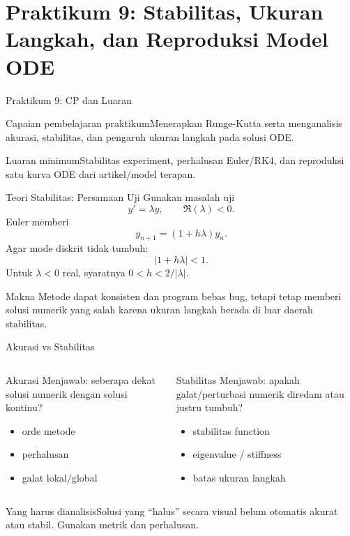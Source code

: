 \documentclass[slides,english,noindex,lean,nobackpage,nocopyright,noupdate,nosummary]{enacom}
\newcommand{\CPBox}[1]{\begin{block}{Capaian pembelajaran praktikum}#1\end{block}}
\newcommand{\OutBox}[1]{\begin{exampleblock}{Luaran minimum}#1\end{exampleblock}}
\newcommand{\AnalysisBox}[1]{\begin{alertblock}{Yang harus dianalisis}#1\end{alertblock}}
\begin{document}
\section{Praktikum 9: Stabilitas, Ukuran Langkah, dan Reproduksi Model ODE}

\begin{frame}{Praktikum 9: CP dan Luaran}
\CPBox{Menerapkan Runge-Kutta serta menganalisis akurasi, stabilitas, dan pengaruh ukuran langkah pada solusi ODE.}
\OutBox{Stabilitas experiment, perhalusan Euler/RK4, dan reproduksi satu kurva ODE dari artikel/model terapan.}
\end{frame}

\begin{frame}{Teori Stabilitas: Persamaan Uji}
Gunakan masalah uji
\[
y'=\lambda y,\qquad \Re(\lambda)<0.
\]
Euler memberi
\[
y_{n+1}=(1+h\lambda)y_n.
\]
Agar mode diskrit tidak tumbuh:
\[
|1+h\lambda|<1.
\]
Untuk $\lambda<0$ real, syaratnya $0<h<2/|\lambda|$.
\begin{alertblock}{Makna}
Metode dapat konsisten dan program bebas bug, tetapi tetap memberi solusi numerik yang salah karena ukuran langkah berada di luar daerah stabilitas.
\end{alertblock}
\end{frame}

\begin{frame}{Akurasi vs Stabilitas}
\begin{columns}[T]
\begin{block}{Akurasi}
Menjawab: seberapa dekat solusi numerik dengan solusi kontinu?
\begin{itemize}
\item orde metode
\item perhalusan
\item galat lokal/global
\end{itemize}
\end{block}
\begin{block}{Stabilitas}
Menjawab: apakah galat/perturbasi numerik diredam atau justru tumbuh?
\begin{itemize}
\item stabilitas function
\item eigenvalue / stiffness
\item batas ukuran langkah
\end{itemize}
\end{block}
\end{columns}
\vfill
\AnalysisBox{Solusi yang ``halus'' secara visual belum otomatis akurat atau stabil. Gunakan metrik dan perhalusan.}
\end{frame}
\end{document}
